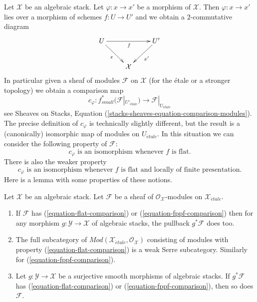 \noindent
Let $\mathcal{X}$ be an algebraic stack. Let $\varphi : x \to x'$ be
a morphism of $\mathcal{X}$. Then $\varphi : x \to x'$ lies over a
morphism of schemes $f : U \to U'$ and we obtain a $2$-commutative diagram
$$
\xymatrix{
U \ar[rd]_x \ar[rr]_f & & U' \ar[ld]^{x'} \\
& \mathcal{X}
}
$$
In particular given a sheaf of modules $\mathcal{F}$ on $\mathcal{X}$
(for the \'etale or a stronger topology) we obtain a comparison map
\begin{equation}
\label{equation-comparison-modules}
c_\varphi :
f_{small}^*(\mathcal{F}|_{U'_{\acute{e}tale}})
\longrightarrow
\mathcal{F}|_{U_{\acute{e}tale}}
\end{equation}
see Sheaves on Stacks, Equation
(\ref{stacks-sheaves-equation-comparison-modules}).
The precise definition of
$c_\varphi$ is technically slightly different, but the result is a
(canonically) isomorphic map of modules on $U_{\acute{e}tale}$.
In this situation we can consider the following property
of $\mathcal{F}$:
\begin{equation}
\label{equation-flat-comparison}
c_\varphi\text{ is an isomorphism whenever }f\text{ is flat.}
\end{equation}
There is also the weaker property
\begin{equation}
\label{equation-fppf-comparison}
c_\varphi\text{ is an isomorphism whenever }f
\text{ is flat and locally of finite presentation.}
\end{equation}
Here is a lemma with some properties of these notions.

\begin{lemma}
\label{lemma-check-flat-comparison-on-etale-covering}
Let $\mathcal{X}$ be an algebraic stack. Let $\mathcal{F}$
be a sheaf of $\mathcal{O}_\mathcal{X}$-modules on
$\mathcal{X}_{\acute{e}tale}$.
\begin{enumerate}
\item If $\mathcal{F}$ has (\ref{equation-flat-comparison}) or
(\ref{equation-fppf-comparison}) then for any morphism
$g : \mathcal{Y} \to \mathcal{X}$ of algebraic stacks, the
pullback $g^*\mathcal{F}$ does too.
\item The full subcategory of
$\textit{Mod}(\mathcal{X}_{\acute{e}tale}, \mathcal{O}_\mathcal{X})$
consisting of modules with property (\ref{equation-flat-comparison})
is a weak Serre subcategory. Similarly for (\ref{equation-fppf-comparison}).
\item  Let $g : \mathcal{Y} \to \mathcal{X}$ be a surjective smooth
morphisms of algebraic stacks. If $g^*\mathcal{F}$
has (\ref{equation-flat-comparison}) or (\ref{equation-fppf-comparison}),
then so does $\mathcal{F}$.
\end{enumerate}
\end{lemma}

